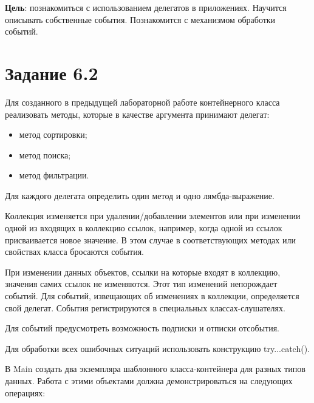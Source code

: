\documentclass{bsuir}
\begin{document}

    \textbf{Цель}: познакомиться с использованием делегатов в приложениях. Научится
    описывать собственные события. Познакомится с механизмом обработки событий.

    \section*{Задание 6.2}

    Для созданного в предыдущей лабораторной работе контейнерного класса
    реализовать методы, которые в качестве аргумента принимают делегат:
    
    \begin{itemize}
        \item метод сортировки;
        \item метод поиска;
        \item метод фильтрации.
    \end{itemize}

    Для каждого делегата определить один метод и одно лямбда-выражение.
    
    Коллекция изменяется при удалении/добавлении элементов или при изменении
    одной из входящих в коллекцию ссылок, например, когда одной из ссылок
    присваивается новое значение. В этом случае в соответствующих методах или
    свойствах класса бросаются события.
    
    При изменении данных объектов, ссылки на которые входят в коллекцию,
    значения самих ссылок не изменяются. Этот тип изменений непорождает событий.
    Для событий, извещающих об изменениях в коллекции, определяется свой
    делегат. События регистрируются в специальных классах-слушателях.
    
    Для событий предусмотреть возможность подписки и отписки отсобытия.
    
    Для обработки всех ошибочных ситуаций использовать конструкцию
    try...catch().
    
    В Main создать два экземпляра шаблонного класса-контейнера для разных типов
    данных. Работа с этими объектами должна демонстрироваться на следующих
    операциях:
    
\end{document}
